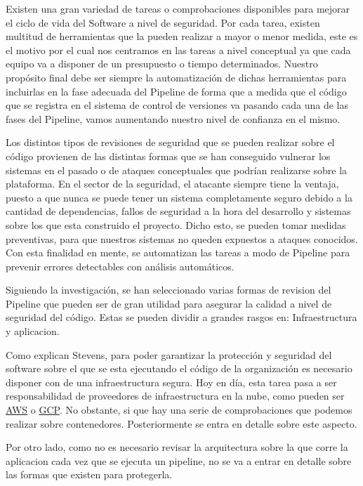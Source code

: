 \documentclass[12pt]{report} %
\begin{document}
Existen una gran variedad de tareas o comprobaciones disponibles para mejorar el
ciclo de vida del Software a nivel de seguridad.  Por cada tarea, existen
multitud de herramientas que la pueden realizar a mayor o menor medida, este es
el motivo por el cual nos centramos en las tareas a nivel conceptual ya que cada
equipo va a disponer de un presupuesto o tiempo determinados.  Nuestro propósito
final debe ser siempre la automatización de dichas herramientas para incluirlas
en la fase adecuada del Pipeline de forma que a medida que el código que se
registra en el sistema de control de versiones va pasando cada una de las fases
del Pipeline, vamos aumentando nuestro nivel de confianza en el mismo.

Los distintos tipos de revisiones de seguridad que se pueden realizar sobre el
código provienen de las distintas formas que se han conseguido vulnerar los
sistemas en el pasado o de ataques conceptuales que podrían realizarse sobre la
plataforma.  En el sector de la seguridad, el atacante siempre tiene la ventaja,
puesto a que nunca se puede tener un sistema completamente seguro debido a la
cantidad de dependencias, fallos de seguridad a la hora del desarrollo y
sistemas sobre los que esta construido el proyecto.  Dicho esto, se pueden tomar
medidas preventivas, para que nuestros sistemas no queden expuestos a ataques
conocidos.  Con esta finalidad en mente, se automatizan las tareas a modo de
Pipeline para prevenir errores detectables con análisis automáticos.

Siguiendo la investigación, se han seleccionado varias formas de revision del
Pipeline que pueden ser de gran utilidad para asegurar la calidad a nivel de
seguridad del código.  Estas se pueden dividir a grandes rasgos en:
Infraestructura y aplicacion.

Como explican \cite{Ensor2021} Stevens, para poder garantizar la protección y
seguridad del software sobre el que se esta ejecutando el código de la
organización es necesario disponer con de una infraestructura segura.  Hoy en
día, esta tarea pasa a ser responsabilidad de proveedores de infraestructura en
la nube, como pueden ser \href{https://aws.amazon.com/}{AWS} o
\href{https://console.cloud.google.com/}{GCP}.  No obstante, si que hay una
serie de comprobaciones que podemos realizar sobre contenedores.  Posteriormente
se entra en detalle sobre este aspecto.

Por otro lado, como no es necesario revisar la arquitectura sobre la que corre
la aplicacion cada vez que se ejecuta un \Gls{pipeline}, no se va a entrar en
detalle sobre las formas que existen para protegerla.
\end{document}

